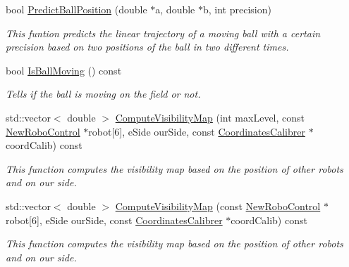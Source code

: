 \begin{DoxyCompactItemize}
bool \hyperlink{classBallMonitor_a914053314023ea79ee691a3031e355bf}{PredictBallPosition} (double $\ast$a, double $\ast$b, int precision)
\begin{DoxyCompactList}\small\item\em This funtion predicts the linear trajectory of a moving ball with a certain precision based on two positions of the ball in two different times. \item\end{DoxyCompactList}\item 
bool \hyperlink{classBallMonitor_a8995e71b82d80987984dd6b1ed89c0a0}{IsBallMoving} () const 
\begin{DoxyCompactList}\small\item\em Tells if the ball is moving on the field or not. \item\end{DoxyCompactList}\item 
std::vector$<$ double $>$ \hyperlink{classBallMonitor_aad046acf9df6b0381ab3b1b8351e97c5}{ComputeVisibilityMap} (int maxLevel, const \hyperlink{classNewRoboControl}{NewRoboControl} $\ast$robot\mbox{[}6\mbox{]}, eSide ourSide, const \hyperlink{classCoordinatesCalibrer}{CoordinatesCalibrer} $\ast$coordCalib) const 
\begin{DoxyCompactList}\small\item\em This function computes the visibility map based on the position of other robots and on our side. \item\end{DoxyCompactList}\item 
std::vector$<$ double $>$ \hyperlink{classBallMonitor_ac30119e22cfe4814670c4eae8c6b5495}{ComputeVisibilityMap} (const \hyperlink{classNewRoboControl}{NewRoboControl} $\ast$robot\mbox{[}6\mbox{]}, eSide ourSide, const \hyperlink{classCoordinatesCalibrer}{CoordinatesCalibrer} $\ast$coordCalib) const 
\begin{DoxyCompactList}\small\item\em This function computes the visibility map based on the position of other robots and on our side. \item\end{DoxyCompactList}\end{DoxyCompactItemize}
